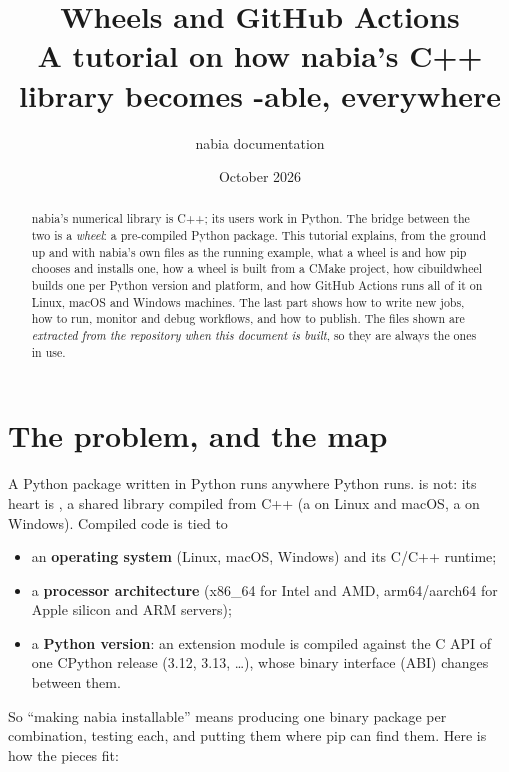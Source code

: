 \documentclass[11pt,a4paper]{article}
\title{Wheels and GitHub Actions\\[0.3em]
\large A tutorial on how nabia's C++ library becomes \code{pip install}-able, everywhere}
\author{nabia documentation}
\date{October 2026}
\begin{document}
\maketitle

\begin{abstract}
nabia's numerical library is C++; its users work in Python. The bridge between the two is a
\emph{wheel}: a pre-compiled Python package. This tutorial explains, from the ground up and with
nabia's own files as the running example, what a wheel is and how pip chooses and installs one,
how a wheel is built from a CMake project, how cibuildwheel builds one per Python version and
platform, and how GitHub Actions runs all of it on Linux, macOS and Windows machines. The last
part shows how to write new jobs, how to run, monitor and debug workflows, and how to publish.
The files shown are \emph{extracted from the repository when this document is built}, so they
are always the ones in use.
\end{abstract}

\tableofcontents
\clearpage

\section{The problem, and the map}

A Python package written in Python runs anywhere Python runs.  is not:
its heart is , a shared library compiled from C++ (a  on Linux and macOS,
a  on Windows). Compiled code is tied to
\begin{itemize}
  \item an \textbf{operating system} (Linux, macOS, Windows) and its C/C++ runtime;
  \item a \textbf{processor architecture} (x86\_64 for Intel and AMD, arm64/aarch64 for Apple
        silicon and ARM servers);
  \item a \textbf{Python version}: an extension module is compiled against the C API of one
        CPython release (3.12, 3.13, \dots), whose binary interface (ABI) changes between them.
\end{itemize}
So ``making nabia installable'' means producing one binary package per combination, testing each,
and putting them where pip can find them. Here is how the pieces fit:
\end{document}

